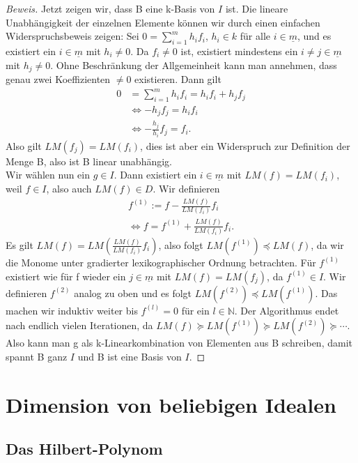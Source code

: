\documentclass{article}
\begin{document}
\begin{proof}[Beweis]
	Jetzt zeigen wir, dass B eine k-Basis von \(I\) ist. Die lineare Unabhängigkeit der einzelnen 
	Elemente können wir durch einen einfachen Widerspruchsbeweis zeigen:
	Sei \(0 = \sum_{i=1}^{m} h_{i}f_{i}\), \(h_{i} \in k\) für alle \(i \in \underline{m}\),
	und es existiert ein \(i \in \underline{m}\) mit \(h_{i} \neq 0\).
	Da \(f_{i} \neq 0\) ist, existiert mindestens ein \(i \neq j \in \underline
	{m}\) mit \(h_{j} \neq 0\). Ohne Beschränkung der Allgemeinheit kann man annehmen, dass genau
	zwei Koeffizienten \(\neq 0\) existieren. Dann gilt
	\begin{align*}
		0 &= \sum_{i=1}^{m} h_{i}f_{i} = h_{i}f_{i} + h_{j}f_{j} \\
		&\Leftrightarrow -h_{j}f_{j} = h_{i}f_{i} \\
		&\Leftrightarrow -\frac{h_{j}}{h_{i}} f_{j} = f_{i}.
	\end{align*}
	Also gilt \(LM(f_{j}) = LM(f_{i})\), dies ist aber ein Widerspruch zur Definition der Menge B,
	also ist B linear unabhängig. \\
	Wir wählen nun ein \(g \in I\). Dann existiert ein \(i \in \underline{m}\) mit \(LM(f) =
	LM(f_{i})\), weil \(f \in I\), also auch \(LM(f) \in D\). Wir definieren
	\begin{align*}
		f^{(1)} := f - \frac{LM(f)}{LM(f_{i})}f_{i} \\
		\Leftrightarrow f = f^{(1)} + \frac{LM(f)}{LM(f_{i})}f_{i}.
	\end{align*}
	Es gilt \(LM(f) = LM(\frac{LM(f)}{LM(f_{i})}f_{i})\), also folgt \(LM(f^{(1)}) \preceq LM(f)\),
	da wir die Monome unter gradierter lexikographischer Ordnung betrachten.
	Für \(f^{(1)}\) existiert wie für f wieder ein \(j \in \underline{m}\) mit \(LM(f) =
	LM(f_{j})\), da \(f^{(1)} \in I\). Wir definieren \(f^{(2)}\) analog zu oben und es
	folgt \(LM(f^{(2)}) \preceq LM(f^{(1)})\). Das machen wir induktiv weiter bis \(f^{(l)} = 0\)  
	für ein \(l \in \mathbb{N}\).
	Der Algorithmus endet nach endlich vielen Iterationen, da \(LM(f) \succeq LM(f^{(1)}) \succeq LM(f^{(2)}) \succeq \cdots\).
	Also kann man g als k-Linearkombination von Elementen aus B schreiben, damit spannt B ganz \(I\) und B ist eine Basis von \(I\).
	\end{proof}


\section{Dimension von beliebigen Idealen}

\subsection{Das Hilbert-Polynom}
\end{document}
